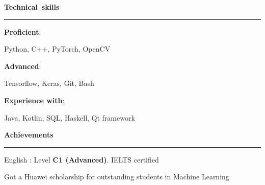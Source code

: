 \documentclass[11pt,a4paper]{report}
\begin{document}
\vspace{5px}
\par\hbox{\Large\textbf{Technical skills}}\kern5pt\hrule
\vspace{10px}

\textbf{Proficient}:

\hspace{10px} Python, C++, PyTorch, OpenCV
\vspace{5px}

\textbf{Advanced}:

\hspace{10px} Tensorflow, Keras, Git, Bash
\vspace{5px}

\textbf{Experience with}:

\hspace{10px} Java, Kotlin, SQL, Haskell, Qt framework
\vspace{10px}

\par\hbox{\Large\textbf{Achievements}}\kern5pt\hrule

\vspace{7px}
\hspace{10px}
English : Level \textbf{C1 (Advanced)}. IELTS certified

\vspace{7px}
\hspace{10px}
Got a Huawei scholarship for outstanding students in Machine Learning
\end{document}
